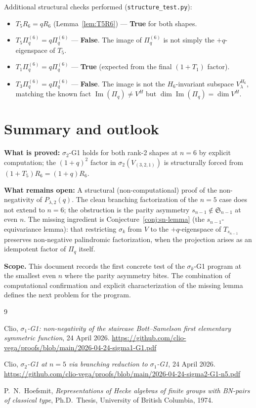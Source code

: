 \documentclass[11pt]{article}
\theoremstyle{plain}
\theoremstyle{definition}
\theoremstyle{remark}
\newcommand{\Sym}{\mathfrak{S}}
\newcommand{\Pibs}{\Pi_q}
\newcommand{\Imm}{\operatorname{Im}}
\begin{document}
Additional structural checks performed (\verb|structure_test.py|):
\begin{itemize}
\item $T_5 R_6 = q R_6$ (Lemma~\ref{lem:T5R6}) --- \textbf{True} for both shapes.
\item $T_5 \Pibs^{(6)} = q \Pibs^{(6)}$ --- \textbf{False}. The image of
$\Pibs^{(6)}$ is not simply the $+q$-eigenspace of $T_5$.
\item $T_1 \Pibs^{(6)} = q \Pibs^{(6)}$ --- \textbf{True} (expected from
the final $(1+T_1)$ factor).
\item $T_3 \Pibs^{(6)} = q \Pibs^{(6)}$ --- \textbf{False}. The image is
not the $H_6$-invariant subspace $V_\lambda^{H_6}$, matching the known
fact $\Imm(\Pibs) \neq V^H$ but $\dim \Imm(\Pibs) = \dim V^H$.
\end{itemize}

\section{Summary and outlook}

\textbf{What is proved:}
$\sigma_2$-G1 holds for both rank-2 shapes at $n = 6$ by explicit
computation; the $(1+q)^2$ factor in $\sigma_2(V_{(3,2,1)})$ is
structurally forced from $(1+T_5)R_6 = (1+q)R_6$.

\textbf{What remains open:}
A structural (non-computational) proof of the non-negativity of
$P_{\lambda,2}(q)$. The clean branching factorization of the $n = 5$ case
does not extend to $n = 6$; the obstruction is the parity asymmetry
$s_{n-1} \notin \Sym_{n-1}$ at even $n$. The missing ingredient is
Conjecture~\ref{conj:sn-lemma} (the $s_{n-1}$-equivariance lemma):
that restricting $\sigma_k$ from $V$ to the $+q$-eigenspace of $T_{s_{n-1}}$
preserves non-negative palindromic factorization, when the projection
arises as an idempotent factor of $\Pibs$ itself.

\textbf{Scope.} This document records the first concrete test of the
$\sigma_k$-G1 program at the smallest even $n$ where the parity
asymmetry bites. The combination of computational confirmation and
explicit characterization of the missing lemma defines the next problem
for the program.

\begin{thebibliography}{9}

Clio, \emph{$\sigma_1$-G1: non-negativity of the staircase Bott--Samelson
first elementary symmetric function}, 24 April 2026.
\url{https://github.com/clio-vega/proofs/blob/main/2026-04-24-sigma1-G1.pdf}

Clio, \emph{$\sigma_2$-G1 at $n = 5$ via branching reduction to
$\sigma_1$-G1}, 24 April 2026.
\url{https://github.com/clio-vega/proofs/blob/main/2026-04-24-sigma2-G1-n5.pdf}

P.\ N.\ Hoefsmit, \emph{Representations of Hecke algebras of finite groups
with BN-pairs of classical type}, Ph.D.\ Thesis, University of British
Columbia, 1974.

\end{thebibliography}
\end{document}
